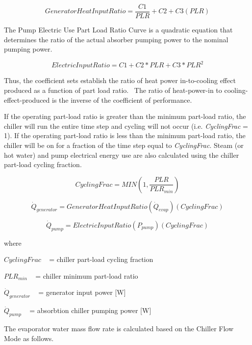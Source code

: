 \begin{equation}
GeneratorHeatInputRatio = \frac{{C1}}{{PLR}} + C2 + C3\left( {PLR} \right)
\end{equation}

The Pump Electric Use Part Load Ratio Curve is a quadratic equation that determines the ratio of the actual absorber pumping power to the nominal pumping power.

\begin{equation}
ElectricInputRatio = C1 + C2 * PLR + C3 * PL{R^2}
\end{equation}

Thus, the coefficient sets establish the ratio of heat power in-to-cooling effect produced as a function of part load ratio.~ The ratio of heat-power-in to cooling-effect-produced is the inverse of the coefficient of performance.

If the operating part-load ratio is greater than the minimum part-load ratio, the chiller will run the entire time step and cycling will not occur (i.e. \emph{CyclingFrac} = 1). If the operating part-load ratio is less than the minimum part-load ratio, the chiller will be on for a fraction of the time step equal to \emph{CyclingFrac}. Steam (or hot water) and pump electrical energy use are also calculated using the chiller part-load cycling fraction.

\begin{equation}
CyclingFrac = MIN\left( {1,\frac{{PLR}}{{PL{R_{min}}}}} \right)
\end{equation}

\begin{equation}
{\dot Q_{generator}} = GeneratorHeatInputRatio\left( {{{\dot Q}_{evap}}} \right)\left( {CyclingFrac} \right)
\end{equation}

\begin{equation}
{\dot Q_{pump}} = ElectricInputRatio\left( {{P_{pump}}} \right)\left( {CyclingFrac} \right)
\end{equation}

where

\(CyclingFrac\) ~ = chiller part-load cycling fraction

\(PL{R_{min}}\) ~ = chiller minimum part-load ratio

\({\dot Q_{generator}}\) ~ = generator input power {[}W{]}

\({\dot Q_{pump}}\) ~ = absorbtion chiller pumping power {[}W{]}

The evaporator water mass flow rate is calculated based on the Chiller Flow Mode as follows.

